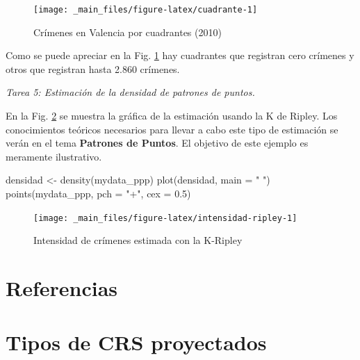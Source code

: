 \documentclass[
]{report}
\newenvironment{Shaded}{\begin{snugshade}}{\end{snugshade}}
\newcommand{\AttributeTok}[1]{\textcolor[rgb]{0.77,0.63,0.00}{#1}}
\newcommand{\FloatTok}[1]{\textcolor[rgb]{0.00,0.00,0.81}{#1}}
\newcommand{\FunctionTok}[1]{\textcolor[rgb]{0.00,0.00,0.00}{#1}}
\newcommand{\NormalTok}[1]{#1}
\newcommand{\OtherTok}[1]{\textcolor[rgb]{0.56,0.35,0.01}{#1}}
\newcommand{\StringTok}[1]{\textcolor[rgb]{0.31,0.60,0.02}{#1}}
\theoremstyle{definition}
\theoremstyle{definition}
\theoremstyle{definition}
\theoremstyle{definition}
\theoremstyle{remark}
\begin{document}
\begin{figure}

{\centering \texttt{[image: \_main\_files/figure-latex/cuadrante-1]} 

}

\caption{Crímenes en Valencia por cuadrantes (2010)}\label{fig:cuadrante}
\end{figure}

Como se puede apreciar en la Fig. \ref{fig:cuadrante} hay cuadrantes que
registran cero crímenes y otros que registran hasta 2.860 crímenes.

\emph{Tarea 5: Estimación de la densidad de patrones de puntos.}

En la Fig. \ref{fig:intensidad-ripley} se muestra la gráfica de la estimación
usando la K de Ripley. Los conocimientos teóricos necesarios para llevar a cabo
este tipo de estimación se verán en el tema \textbf{Patrones de Puntos}. El objetivo
de este ejemplo es meramente ilustrativo.

\begin{Shaded}
\begin{Highlighting}[]
\NormalTok{densidad }\OtherTok{\textless{}{-}} \FunctionTok{density}\NormalTok{(mydata\_ppp)}
\FunctionTok{plot}\NormalTok{(densidad, }\AttributeTok{main =} \StringTok{" "}\NormalTok{)}
\FunctionTok{points}\NormalTok{(mydata\_ppp, }\AttributeTok{pch =} \StringTok{"+"}\NormalTok{, }\AttributeTok{cex =} \FloatTok{0.5}\NormalTok{)}
\end{Highlighting}
\end{Shaded}

\begin{figure}

{\centering \texttt{[image: \_main\_files/figure-latex/intensidad-ripley-1]} 

}

\caption{Intensidad de crímenes estimada con la K-Ripley}\label{fig:intensidad-ripley}
\end{figure}

\hypertarget{referencias}{%
\chapter{Referencias}\label{referencias}}

\hypertarget{appendix-anexo}{%
\appendix}


\hypertarget{crsproy}{%
\chapter{Tipos de CRS proyectados}\label{crsproy}}
\end{document}
